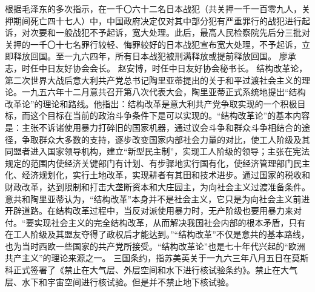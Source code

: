 \begin{maonote}
根据毛泽东的多次指示，在一千〇六十二名日本战犯（共关押一千一百零九人，关押期间死亡四十七人）中，中国政府决定仅对其中部分犯有严重罪行的战犯进行起诉，对次要和一般战犯不予起诉，宽大处理。此后，最高人民检察院先后分三批对关押的一千〇十七名罪行较轻、悔罪较好的日本战犯宣布宽大处理，不予起诉，立即释放回国。至一九六四年，所有日本战犯被刑满释放或提前释放回国。
廖承志，时任中日友好协会会长。
赵安博，时任中日友好协会秘书长。
结构改革论，第二次世界大战后意大利共产党总书记陶里亚蒂提出的关于和平过渡社会主义的理论。一九五六年十二月意共召开第八次代表大会，陶里亚蒂正式系统地提出“结构改革论”的理论和路线。他指出：结构改革是意大利共产党争取实现的一个积极目标，而这个目标在当前的政治斗争条件下是可以实现的。“结构改革论”的基本内容是：主张不诉诸使用暴力打碎旧的国家机器，通过议会斗争和群众斗争相结合的途径，争取群众大多数的支持，逐步改变国家内部社会力量的对比，使工人阶级及其同盟者进入国家领导机构，建立“新型民主制”，实现工人阶级的领导；主张在宪法规定的范围内使经济关键部门有计划、有步骤地实行国有化，使经济管理部门民主化、经济规划化，实行土地改革，实现耕者有其田和技术进步。通过国家的税收和财政改革，达到限制和打击大垄断资本和大庄园主，为向社会主义过渡准备条件。意共和陶里亚蒂认为，“结构改革”本身并不是社会主义，它只是为向社会主义前进开辟道路。在结构改革过程中，当反对派使用暴力时，无产阶级也要用暴力来对付。“要实现社会主义的完全结构改革，从而解决我国社会内部的根本矛盾，只有在工人阶级及其盟友夺得了政权后才能达到。”“结构改革”不仅是意共的基本路线，也为当时西欧一些国家的共产党所接受。“结构改革论”也是七十年代兴起的“欧洲共产主义”的理论来源之一。
三国条约，指苏美英关于一九六三年八月五日在莫斯科正式签署了《禁止在大气层、外层空间和水下进行核试验条约》。禁止在大气层、水下和宇宙空间进行核试验。但是并不禁止地下核试验。
\end{maonote}
